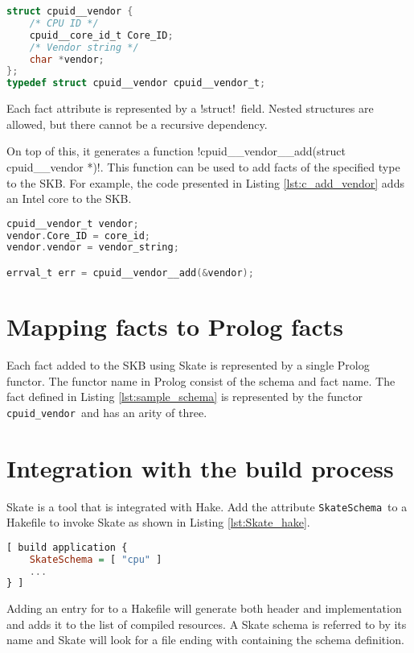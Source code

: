 \documentclass[a4paper,11pt,twoside]{report}
\begin{document}
{{\begin{lstlisting}[caption={C header for fact
\varname{vendor}},label={lst:c_vendor},language=C]
struct cpuid__vendor {
    /* CPU ID */
    cpuid__core_id_t Core_ID;
    /* Vendor string */
    char *vendor;
};
typedef struct cpuid__vendor cpuid__vendor_t;
\end{lstlisting}

Each fact attribute is represented by a \ccode!struct!~field. Nested structures are
allowed, but there cannot be a recursive dependency.

On top of this, it generates a function
\ccode!cpuid__vendor__add(struct cpuid__vendor *)!.
This function can be used to add facts of the specified type to the SKB. For
example, the code presented in Listing \ref{lst:c_add_vendor} adds an Intel core
to the SKB.

\begin{lstlisting}[caption={C example to add a vendor fact.},
label={lst:c_add_vendor}, language=C]
cpuid__vendor_t vendor;
vendor.Core_ID = core_id;
vendor.vendor = vendor_string;

errval_t err = cpuid__vendor__add(&vendor);
\end{lstlisting}

\section{Mapping facts to Prolog facts}

Each fact added to the SKB using Skate is represented by a single Prolog
functor.  The functor name in Prolog consist of the schema and fact name.  The
fact defined in Listing \ref{lst:sample_schema} is represented by the functor
\lstinline!cpuid_vendor!~and has an arity of three.

\section{Integration with the build process}

Skate is a tool that is integrated with Hake. Add the attribute
\lstinline!SkateSchema!~to a Hakefile to invoke Skate as shown in Listing
\ref{lst:Skate_hake}.

\begin{lstlisting}[caption={Including Skate schemata in Hake},
label={lst:Skate_hake}, language=Haskell]
[ build application {
    SkateSchema = [ "cpu" ]
    ... 
} ]
\end{lstlisting}

Adding an entry for  to a Hakefile will generate both
header and implementation and adds it to the list of compiled resources. A
Skate schema is referred to by its name and Skate will look for a file
ending with  containing the schema definition.

}}
\end{document}
